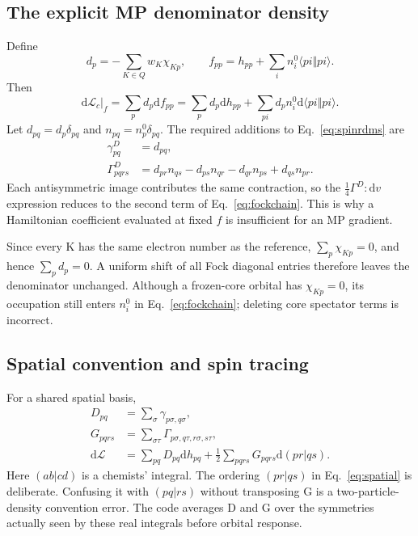 \documentclass[11pt,letterpaper]{article}
\numberwithin{equation}{section}
\newcommand{\dd}{\mathrm d}
\begin{document}
\subsection{The explicit MP denominator density}
\label{sec:fock}
Define
\begin{equation}
 d_p=-\sum_{K\in Q}w_K\chi_{Kp},\qquad
 f_{pp}=h_{pp}+\sum_i n_i^0\langle pi\Vert pi\rangle.
 \label{eq:dfock}
\end{equation}
Then
\begin{equation}
 \dd\mathcal L_c\big|_f=\sum_p d_p\dd f_{pp}
 =\sum_p d_p\dd h_{pp}+\sum_{pi}d_pn_i^0\dd\langle pi\Vert pi\rangle.
 \label{eq:fockchain}
\end{equation}
Let $d_{pq}=d_p\delta_{pq}$ and $n_{pq}=n_p^0\delta_{pq}$. The required
additions to Eq.~\eqref{eq:spinrdms} are
\begin{align}
 \gamma^D_{pq}&=d_{pq},\\
 \Gamma^D_{pqrs}&=d_{pr}n_{qs}-d_{ps}n_{qr}
                         -d_{qr}n_{ps}+d_{qs}n_{pr}.
 \label{eq:denrdm}
\end{align}
Each antisymmetric image contributes the same contraction, so the
$\tfrac14\Gamma^D:\dd v$ expression reduces to the second term of
Eq.~\eqref{eq:fockchain}. This is why a Hamiltonian coefficient evaluated
at fixed $f$ is insufficient for an MP gradient.

Since every K has the same electron number as the reference,
$\sum_p\chi_{Kp}=0$, and hence $\sum_p d_p=0$. A uniform shift of all Fock
diagonal entries therefore leaves the denominator unchanged. Although a
frozen-core orbital has $\chi_{Kp}=0$, its occupation still enters $n_i^0$
in Eq.~\eqref{eq:fockchain}; deleting core spectator terms is incorrect.

\subsection{Spatial convention and spin tracing}
For a shared spatial basis,
\begin{align}
 D_{pq}&=\sum_\sigma\gamma_{p\sigma,q\sigma},\\
 G_{pqrs}&=\sum_{\sigma\tau}
                  \Gamma_{p\sigma,q\tau,r\sigma,s\tau},\\
 \dd\mathcal L&=\sum_{pq}D_{pq}\dd h_{pq}
                       +\frac12\sum_{pqrs}G_{pqrs}\dd(pr|qs).
 \label{eq:spatial}
\end{align}
Here $(ab|cd)$ is a chemists' integral. The ordering $(pr|qs)$ in
Eq.~\eqref{eq:spatial} is deliberate. Confusing it with $(pq|rs)$ without
transposing G is a two-particle-density convention error. The code averages
D and G over the symmetries actually seen by these real integrals before
orbital response.
\end{document}
